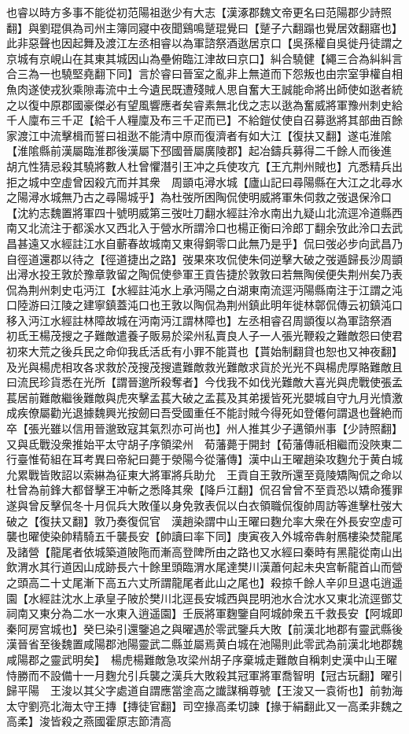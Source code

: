 也睿以時方多事不能從初范陽祖逖少有大志【漢涿郡魏文帝更名曰范陽郡少詩照翻】與劉琨俱為司州主簿同寢中夜聞鷄鳴蹵琨覺曰【蹵子六翻蹋也覺居效翻寤也】此非惡聲也因起舞及渡江左丞相睿以為軍諮祭酒逖居京口【吳孫權自吳徙丹徒謂之京城有京峴山在其東其城因山為壘俯臨江津故曰京口】糾合驍健【繩三合為糾糾言合三為一也驍堅堯翻下同】言於睿曰晉室之亂非上無道而下怨叛也由宗室爭權自相魚肉遂使戎狄乘隙毒流中土今遺民既遭殘賊人思自奮大王誠能命將出師使如逖者統之以復中原郡國豪傑必有望風響應者矣睿素無北伐之志以逖為奮威將軍豫州刺史給千人廩布三千疋【給千人糧廩及布三千疋而已】不給鎧仗使自召募逖將其部曲百餘家渡江中流擊楫而誓曰祖逖不能清中原而復濟者有如大江【復扶又翻】遂屯淮隂【淮隂縣前漢屬臨淮郡後漢屬下邳國晉屬廣陵郡】起冶鑄兵募得二千餘人而後進　胡亢性猜忌殺其驍將數人杜曾懼潛引王冲之兵使攻亢【王亢荆州賊也】亢悉精兵出拒之城中空虛曾因殺亢而并其衆　周顗屯潯水城【廬山記曰尋陽縣在大江之北尋水之陽潯水城無乃古之尋陽城乎】為杜弢所困陶侃使明威將軍朱伺救之弢退保泠口【沈約志魏置將軍四十號明威第三弢吐刀翻水經註泠水南出九疑山北流逕冷道縣西南又北流注于都溪水又西北入于營水所謂泠口也楊正衡曰泠郎丁翻余攷此泠口去武昌甚遠又水經註江水自蘄春故城南又東得銅零口此無乃是乎】侃曰弢必步向武昌乃自徑道還郡以待之【徑道捷出之路】弢果來攻侃使朱伺逆擊大破之弢遁歸長沙周顗出潯水投王敦於豫章敦留之陶侃使參軍王貢告捷於敦敦曰若無陶侯便失荆州矣乃表侃為荆州刺史屯沔江【水經註沌水上承沔陽之白湖東南流逕沔陽縣南注于江謂之沌口陸游曰江陵之建寧鎮蓋沌口也王敦以陶侃為荆州鎮此明年徙林鄣侃傳云初鎮沌口移入沔江水經註林障故城在沔南沔江謂林障也】左丞相睿召周顗復以為軍諮祭酒　初氐王楊茂搜之子難敵遣養子販易於梁州私賣良人子一人張光鞭殺之難敵怨曰使君初來大荒之後兵民之命仰我氐活氐有小罪不能貰也【貰始制翻貸也恕也又神夜翻】及光與楊虎相攻各求救於茂搜茂搜遣難敵救光難敵求貨於光光不與楊虎厚賂難敵且曰流民珍貨悉在光所【謂晉邈所殺奪者】今伐我不如伐光難敵大喜光與虎戰使張孟萇居前難敵繼後難敵與虎夾擊孟萇大破之孟萇及其弟援皆死光嬰城自守九月光憤激成疾僚屬勸光退據魏興光按劒曰吾受國重任不能討賊今得死如登僊何謂退也聲絶而卒【張光雖以信用晉邈致寇其氣烈亦可尚也】州人推其少子邁領州事【少詩照翻】又與氐戰没衆推始平太守胡子序領梁州　荀藩薨于開封【荀藩傳祇相繼而没陜東二行臺惟荀組在耳考異曰帝紀曰薨于滎陽今從藩傳】漢中山王曜趙染攻麴允于黄白城允累戰皆敗詔以索綝為征東大將軍將兵助允　王貢自王敦所還至竟陵矯陶侃之命以杜曾為前鋒大都督擊王冲斬之悉降其衆【降戶江翻】侃召曾曾不至貢恐以矯命獲罪遂與曾反擊侃冬十月侃兵大敗僅以身免敦表侃以白衣領職侃復帥周訪等進擊杜弢大破之【復扶又翻】敦乃奏復侃官　漢趙染謂中山王曜曰麴允率大衆在外長安空虛可襲也曜使染帥精騎五千襲長安【帥讀曰率下同】庚寅夜入外城帝犇射鴈樓染焚龍尾及諸營【龍尾者依城築道陂陁而漸高登陴所由之路也又水經曰秦時有黑龍從南山出飲渭水其行道因山成跡長六十餘里頭臨渭水尾達樊川漢蕭何起未央宫斬龍首山而營之頭高二十丈尾漸下高五六丈所謂龍尾者此山之尾也】殺掠千餘人辛卯旦退屯逍遥園【水經註沈水上承皇子陂於樊川北逕長安城西與昆明池水合沈水又東北流逕鄧艾祠南又東分為二水一水東入逍遥園】壬辰將軍麴鑒自阿城帥衆五千救長安【阿城即秦阿房宫城也】癸巳染引還鑒追之與曜遇於零武鑒兵大敗【前漢北地郡有靈武縣後漢晉省至後魏置咸陽郡池陽靈武二縣並屬焉黄白城在池陽則此零武為前漢北地郡魏咸陽郡之靈武明矣】　楊虎楊難敵急攻梁州胡子序棄城走難敵自稱刺史漢中山王曜恃勝而不設備十一月麴允引兵襲之漢兵大敗殺其冠軍將軍喬智明【冠古玩翻】曜引歸平陽　王浚以其父字處道自謂應當塗高之䜟謀稱尊號【王浚又一袁術也】前勃海太守劉亮北海太守王摶【摶徒官翻】司空掾高柔切諫【掾于絹翻此又一高柔非魏之高柔】浚皆殺之燕國霍原志節清高
